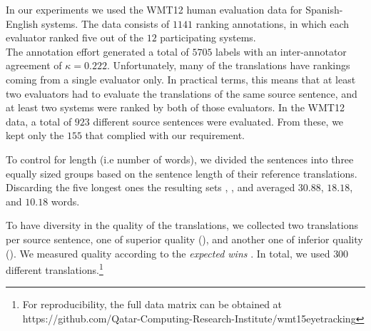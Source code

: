 In our experiments we used the WMT12 \cite{WMT12} human evaluation data for Spanish-English systems. The data consists of $1141$ ranking annotations, in which each evaluator ranked %
five out of the $12$ participating systems. \\
The annotation effort generated a total of $5705$ labels with an inter-annotator agreement of $\kappa=0.222$. Unfortunately, many of the translations have rankings coming from a single evaluator only. %
In practical terms, this means that at least two evaluators had to evaluate the translations of the same source sentence, and 
at least two systems were ranked by both of those evaluators.
In the WMT12 data, a total of $923$ different source sentences were evaluated. %
From these, we kept only the $155$ that complied with our requirement. 

\vspace{5pt}
To control for length (i.e number of words), we divided the sentences into three equally sized groups based on the sentence length of their reference translations.  Discarding the five longest ones the resulting sets \llong, \lmid, and \lshort averaged $30.88$, $18.18$, and $10.18$ words.
\vspace{5pt}

To have diversity in the quality of the translations, 
we collected two translations per source sentence, one of superior quality (\qmax), and another one of inferior quality (\qmin). We measured quality 
according to the \emph{expected wins} \cite{WMT12}. In total, we used $300$ different translations.\footnote{For reproducibility, the full data matrix can be obtained at {https://github.com/Qatar-Computing-Research-Institute/wmt15eyetracking}}
\vspace{5pt}


